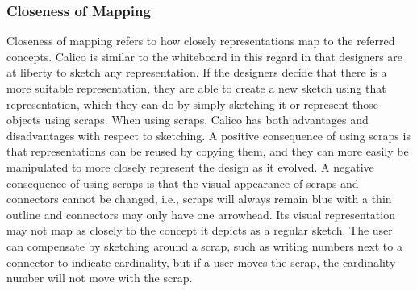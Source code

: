 \documentclass[12pt,fleqn]{ucithesis}
\begin{document}
\subsubsection{Closeness of Mapping}
Closeness of mapping refers to how closely representations map to the referred concepts. Calico is similar to the whiteboard in this regard in that designers are at liberty to sketch any representation. If the designers decide that there is a more suitable representation, they are able to create a new sketch using that representation, which they can do by simply sketching it or represent those objects using scraps. When using scraps, Calico has both advantages and disadvantages with respect to sketching. A positive consequence of using scraps is that representations can be reused by copying them, and they can more easily be manipulated to more closely represent the design as it evolved. A negative consequence of using scraps is that the visual appearance of scraps and connectors cannot be changed, i.e., scraps will always remain blue with a thin outline and connectors may only have one arrowhead. Its visual representation may not map as closely to the concept it depicts as a regular sketch. The user can compensate by sketching around a scrap, such as writing numbers next to a connector to indicate cardinality, but if a user moves the scrap, the cardinality number will not move with the scrap.


%
\end{document}
